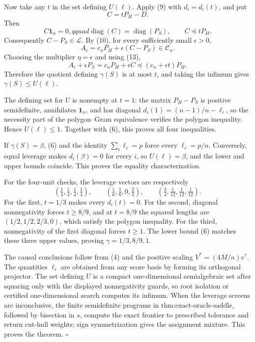 Now take any \(t\) in the set defining \(U(\ell)\).  Apply (9) with \(d_i=d_i(t)\), and put
\[
C=tP_H-D.
\tag{12}
\]
Then
\[
C\mathbf1_n=0,qquad \operatorname{diag}(C)=\operatorname{diag}(P_S),
\qquad C\preceq tP_H.
\tag{13}
\]
Consequently \(C-P_S\in\mathcal L\).  By (10), for every sufficiently small \(\epsilon>0\),
\[
A_\epsilon=c_nP_H+\epsilon(C-P_S)\in\mathcal C_n.
\tag{14}
\]
Choosing the multiplier \(\eta=\epsilon\) and using (13),
\[
A_\epsilon+\epsilon P_S=c_nP_H+\epsilon C
\preceq(c_n+\epsilon t)P_H.
\]
Therefore the quotient defining \(\gamma(S)\) is at most \(t\), and taking the infimum gives \(\gamma(S)\leq U(\ell)\).

The defining set for \(U\) is nonempty at \(t=1\): the matrix \(P_H-P_S\) is positive semidefinite, annihilates \(\mathbf1_n\), and has diagonal \(d_i(1)=(n-1)/n-\ell_i\), so the necessity part of the polygon--Gram equivalence verifies the polygon inequality.  Hence \(U(\ell)\leq1\).  Together with (6), this proves all four inequalities.

If \(\gamma(S)=\beta\), (6) and the identity \(\sum_i\ell_i=p\) force every \(\ell_i=p/n\).  Conversely, equal leverage makes \(d_i(\beta)=0\) for every \(i\), so \(U(\ell)=\beta\), and the lower and upper bounds coincide.  This proves the equality characterization.

For the four-unit checks, the leverage vectors are respectively
\[
\left(\tfrac14,\tfrac14,\tfrac14,\tfrac14\right),\qquad
\left(\tfrac16,\tfrac16,0,\tfrac23\right),\qquad
\left(\tfrac34,\tfrac1{12},\tfrac1{12},\tfrac1{12}\right).
\tag{15}
\]
For the first, \(t=1/3\) makes every \(d_i(t)=0\).  For the second, diagonal nonnegativity forces \(t\geq8/9\), and at \(t=8/9\) the squared lengths are \((1/2,1/2,2/3,0)\), which satisfy the polygon inequality.  For the third, nonnegativity of the first diagonal forces \(t\geq1\).  The lower bound (6) matches these three upper values, proving \(\gamma=1/3,8/9,1\).

The causal conclusions follow from (4) and the positive scaling \(V^*=(4M/n)v^*\).  The quantities \(\ell_i\) are obtained from any score basis by forming its orthogonal projector.  The set defining \(U\) is a compact one-dimensional semialgebraic set after squaring only with the displayed nonnegativity guards, so root isolation or certified one-dimensional search computes its infimum.  When the leverage screens are inconclusive, the finite semidefinite programs in \(\text{thm:exact-oracle-saddle}\), followed by bisection in \(s\), compute the exact frontier to prescribed tolerance and return cut-hull weights; sign symmetrization gives the assignment mixture.  This proves the theorem. \(\square\)